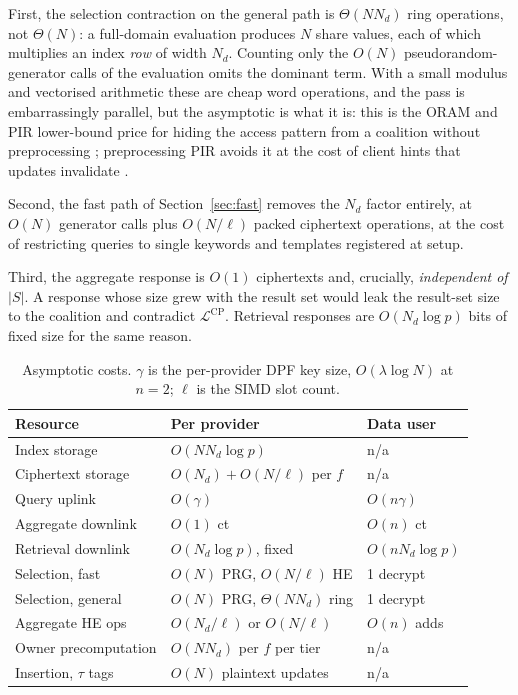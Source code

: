 \documentclass[a4paper,fleqn]{cas-dc}
\newcommand{\Leak}{\mathcal{L}}
\begin{document}
First, the selection contraction on the general path is $\Theta(N N_d)$ ring
operations, not $\Theta(N)$: a full-domain evaluation produces $N$ share
values, each of which multiplies an index \emph{row} of width $N_d$. Counting
only the $O(N)$ pseudorandom-generator calls of the evaluation omits the
dominant term. With a small modulus and vectorised arithmetic these are cheap
word operations, and the pass is embarrassingly parallel, but the asymptotic
is what it is: this is the ORAM and PIR lower-bound price for hiding the
access pattern from a coalition without preprocessing
\citep{goldreich1996software,beimel2000reducing}; preprocessing PIR avoids it
at the cost of client hints that updates invalidate
\citep{corrigan2020private}.

Second, the fast path of Section~\ref{sec:fast} removes the $N_d$ factor
entirely, at $O(N)$ generator calls plus $O(N/\ell)$ packed ciphertext
operations, at the cost of restricting queries to single keywords and
templates registered at setup.

Third, the aggregate response is $O(1)$ ciphertexts and, crucially,
\emph{independent of $|S|$}. A response whose size grew with the result set
would leak the result-set size to the coalition and contradict
$\Leak^{\text{CP}}$. Retrieval responses are $O(N_d\log p)$ bits of fixed size
for the same reason.

\begin{table}[pos=t]
\caption{Asymptotic costs. $\gamma$ is the per-provider DPF key size,
$O(\lambda\log N)$ at $n=2$; $\ell$ is the SIMD slot count.}
\label{tab:complexity}
\centering
\scriptsize
\setlength{\tabcolsep}{2pt}
\renewcommand{\arraystretch}{1.2}
\begin{tabular*}{\tblwidth}{@{\extracolsep{\fill}}lll@{}}
\toprule
Resource & Per provider & Data user \\
\midrule
Index storage           & $O(N N_d\log p)$                  & n/a \\
Ciphertext storage      & $O(N_d)+O(N/\ell)$ per $f$        & n/a \\
Query uplink            & $O(\gamma)$                       & $O(n\gamma)$ \\
Aggregate downlink      & $O(1)$ ct                         & $O(n)$ ct \\
Retrieval downlink      & $O(N_d\log p)$, fixed             & $O(nN_d\log p)$ \\
Selection, fast         & $O(N)$ PRG, $O(N/\ell)$ HE        & 1 decrypt \\
Selection, general      & $O(N)$ PRG, $\Theta(NN_d)$ ring   & 1 decrypt \\
Aggregate HE ops        & $O(N_d/\ell)$ or $O(N/\ell)$      & $O(n)$ adds \\
Owner precomputation    & $O(NN_d)$ per $f$ per tier        & n/a \\
Insertion, $\tau$ tags  & $O(N)$ plaintext updates          & n/a \\
\bottomrule
\end{tabular*}
\end{table}
\end{document}
